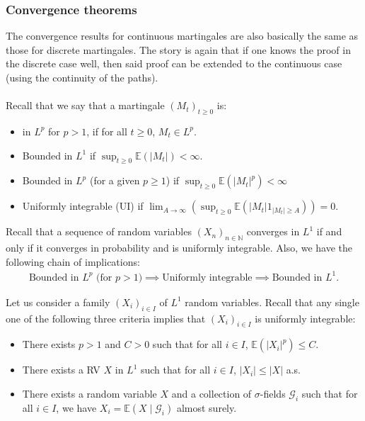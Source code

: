 \documentclass[../mainfile.tex]{subfiles}
\begin{document}
\subsubsection{Convergence theorems}
The convergence results for continuous martingales are also basically the same as those for discrete martingales. The story is again that if one knows the proof in the discrete case well, then said proof can be extended to the continuous case (using the continuity of the paths). \\
\\
Recall that we say that a martingale $(M_t)_{t \geq 0}$ is: 
\begin{itemize}
\item in $L^p$ for $p >1$, if for all $t \geq 0$, $M_t \in L^p$.
\item Bounded in $L^1$ if $\sup_{t \geq 0} \mathbb{E}(|M_t|) < \infty.$
\item Bounded in $L^p$ (for a given $p \geq 1$) if $\sup_{t \geq 0} \mathbb{E}(|M_t|^p) < \infty$
\item Uniformly integrable (UI) if $
\displaystyle \lim_{A \to \infty} ( \sup_{t \geq 0} \mathbb{E}( |M_t| 1_{|M_t| \geq A}))=0. $

\end{itemize}
\begin{rem} Recall that a sequence of random variables $(X_n)_{n \in \mathbb{N}}$ converges in $L^1$ if and only if it converges in probability and is uniformly integrable. Also,  we have the following chain of implications:
\begin{align*}
\text{Bounded in }L^p \text{ (for }p > 1) \implies \text{Uniformly integrable} \implies \text{Bounded in }L^1. 
\end{align*}
\end{rem}
\begin{rem} Let us consider a family $(X_i)_{i \in I}$ of $L^1$ random variables. Recall that any single one of the following three criteria implies that $(X_i)_{i \in I}$ is uniformly integrable:
\begin{itemize}
\item There exists $p>1$ and $C>0$ such that for all $i \in I$, $\mathbb{E}( |X_i|^p) \leq C$. 
\item There exists a RV $X$ in $L^1$ such that for all $i \in I$, $|X_i| \leq |X|$ a.s.
\item There exists a random variable $X$ and a collection of $\sigma$-fields $\mathcal{G}_i$ such that for all $i \in I$, we have $X_i = \mathbb{E}(X \mid \mathcal{G}_i)$ almost surely. 
\end{itemize}
\end{rem}
\end{document}
